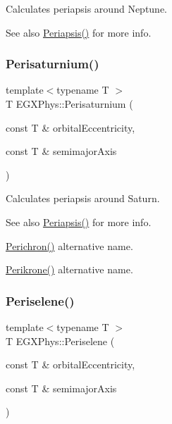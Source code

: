 Calculates periapsis around Neptune. 

\begin{DoxySeeAlso}{See also}
\mbox{\hyperlink{group___e_g_x_phys-_periapsis_ga4414ac75539371ec874a3d25cad6c9fe}{Periapsis()}} for more info. 
\end{DoxySeeAlso}
\mbox{\label{group___e_g_x_phys-_periapsis_ga60a50d09d29ebe47cbbfc125c2ea42bf}} 
\subsubsection{\texorpdfstring{Perisaturnium()}{Perisaturnium()}}
{\footnotesize\ttfamily template$<$typename T $>$ \\
T E\+G\+X\+Phys\+::\+Perisaturnium (\begin{DoxyParamCaption}\item[{const T \&}]{orbital\+Eccentricity,  }\item[{const T \&}]{semimajor\+Axis }\end{DoxyParamCaption})}



Calculates periapsis around Saturn. 

\begin{DoxySeeAlso}{See also}
\mbox{\hyperlink{group___e_g_x_phys-_periapsis_ga4414ac75539371ec874a3d25cad6c9fe}{Periapsis()}} for more info. 

\mbox{\hyperlink{group___e_g_x_phys-_periapsis_ga12b5e99aa2e3e7031ef6ce93060cf516}{Perichron()}} alternative name. 

\mbox{\hyperlink{group___e_g_x_phys-_periapsis_gaa56f74c44a3583b8f0d13b821c1d7422}{Perikrone()}} alternative name. 
\end{DoxySeeAlso}
\mbox{\label{group___e_g_x_phys-_periapsis_ga255874374dde571531e443cdbef9ef0c}} 
\subsubsection{\texorpdfstring{Periselene()}{Periselene()}}
{\footnotesize\ttfamily template$<$typename T $>$ \\
T E\+G\+X\+Phys\+::\+Periselene (\begin{DoxyParamCaption}\item[{const T \&}]{orbital\+Eccentricity,  }\item[{const T \&}]{semimajor\+Axis }\end{DoxyParamCaption})}



